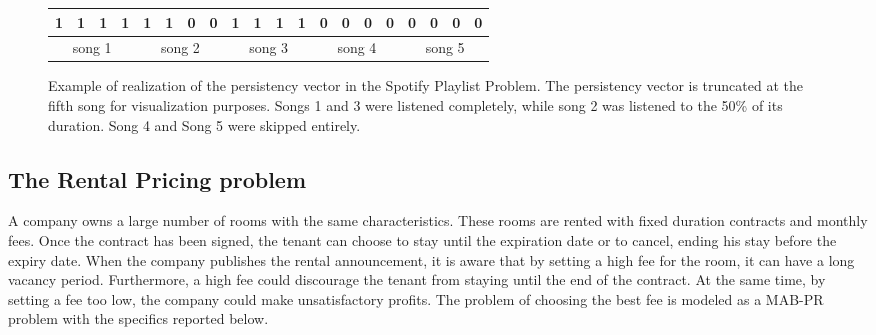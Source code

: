 \begin{figure}[h]
	
	\centering
		\begin{tabular}{cccccccccccccccccccc}
			\hline
			\multicolumn{1}{|c}{1} & 1 & 1 & \multicolumn{1}{c|}{1} & 1 & 1 & 0 & \multicolumn{1}{c|}{0} & 1 & 1 & 1 & \multicolumn{1}{c|}{1} & 0 & 0 & 0 & \multicolumn{1}{c|}{0} & 0 & 0 & 0 & \multicolumn{1}{c|}{0} \\ \hline
			\multicolumn{4}{c}{song 1}                              & \multicolumn{4}{c}{song 2}         & \multicolumn{4}{c}{song 3}         & \multicolumn{4}{c}{song 4}         & \multicolumn{4}{c}{song 5}        
		\end{tabular}



\caption{Example of realization of the persistency vector in the Spotify Playlist Problem. The persistency vector is truncated at the fifth song for visualization purposes. Songs 1 and 3 were listened completely, while song 2 was listened to the 50\% of its duration. Song 4 and Song 5 were skipped entirely.}
\label{bucket_spotify}
\end{figure}






\subsection{The Rental Pricing problem}
A company owns a large number of rooms with the same characteristics. These rooms are rented with fixed duration contracts and monthly fees. Once the contract has been signed, the tenant can choose to stay until the expiration date or to cancel, ending his stay before the expiry date. When the company publishes the rental announcement, it is aware that by setting a high fee for the room, it can have a long vacancy period. Furthermore, a high fee could discourage the tenant from staying until the end of the contract. At the same time, by setting a fee too low, the company could make unsatisfactory profits. The problem of choosing the best fee is modeled as a MAB-PR problem with the specifics reported below.

